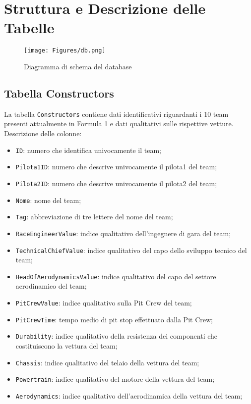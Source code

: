 \section{Struttura e Descrizione delle Tabelle}

\begin{figure}[htbp]
    \centering
    \texttt{[image: Figures/db.png]}
    \caption{Diagramma di schema del database}
    \label{fig:database-schema}
\end{figure}

\subsection{Tabella Constructors}

La tabella \texttt{Constructors} contiene dati identificativi riguardanti i 10 team presenti attualmente in Formula 1 e dati qualitativi sulle rispettive vetture. \\
Descrizione delle colonne:
\begin{itemize}
    \item \texttt{ID}: numero che identifica univocamente il team;
    \item \texttt{Pilota1ID}: numero che descrive univocamente il pilota1 del team;
    \item \texttt{Pilota2ID}: numero che descrive univocamente il pilota2 del team;
    \item \texttt{Nome}: nome del team;
    \item \texttt{Tag}: abbreviazione di tre lettere del nome del team;
    \item \texttt{RaceEngineerValue}: indice qualitativo dell’ingegnere di gara del team;
    \item \texttt{TechnicalChiefValue}: indice qualitativo del capo dello sviluppo tecnico del team;
    \item \texttt{HeadOfAerodynamicsValue}: indice qualitativo del capo del settore aerodinamico del team;
    \item \texttt{PitCrewValue}: indice qualitativo sulla Pit Crew del team;
    \item \texttt{PitCrewTime}: tempo medio di pit stop effettuato dalla Pit Crew;
    \item \texttt{Durability}: indice qualitativo della resistenza dei componenti che costituiscono la vettura del team;
    \item \texttt{Chassis}: indice qualitativo del telaio della vettura del team;
    \item \texttt{Powertrain}: indice qualitativo del motore della vettura del team;
    \item \texttt{Aerodynamics}: indice qualitativo dell’aerodinamica della vettura del team;
\end{itemize}

